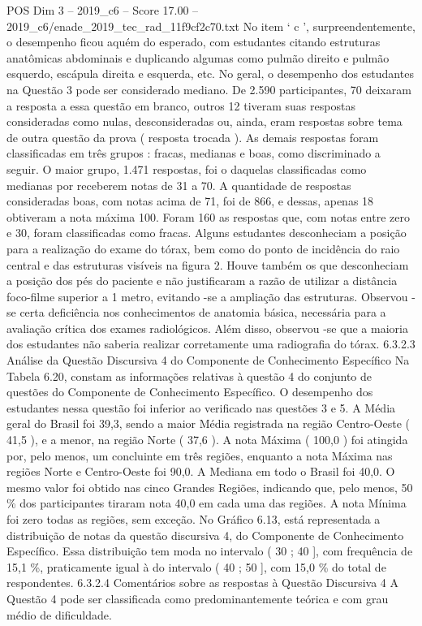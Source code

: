 \begin{textsample}{POS Dim 3 – 2019\_c6 – Score 17.00 – 2019\_c6/enade\_2019\_tec\_rad\_11f9cf2c70.txt}
No item ‘ c ’, surpreendentemente, o desempenho ficou aquém do esperado, com estudantes citando estruturas anatômicas abdominais e duplicando algumas como pulmão direito e pulmão esquerdo, escápula direita e esquerda, etc.
No geral, o desempenho dos estudantes na Questão 3 pode ser considerado mediano.
De 2.590 participantes, 70 deixaram a resposta a essa questão em branco, outros 12 tiveram suas respostas consideradas como nulas, desconsideradas ou, ainda, eram respostas sobre tema de outra questão da prova ( resposta trocada ).
As demais respostas foram classificadas em três grupos : fracas, medianas e boas, como discriminado a seguir.
O maior grupo, 1.471 respostas, foi o daquelas classificadas como medianas por receberem notas de 31 a 70.
A quantidade de respostas consideradas boas, com notas acima de 71, foi de 866, e dessas, apenas 18 obtiveram a nota máxima 100.
Foram 160 as respostas que, com notas entre zero e 30, foram classificadas como fracas.
Alguns estudantes desconheciam a posição para a realização do exame do tórax, bem como do ponto de incidência do raio central e das estruturas visíveis na figura 2.
Houve também os que desconheciam a posição dos pés do paciente e não justificaram a razão de utilizar a distância foco-filme superior a 1 metro, evitando -se a ampliação das estruturas.
Observou -se certa deficiência nos conhecimentos de anatomia básica, necessária para a avaliação crítica dos exames radiológicos.
Além disso, observou -se que a maioria dos estudantes não saberia realizar corretamente uma radiografia do tórax. 6.3.2.3 Análise da Questão Discursiva 4 do Componente de Conhecimento Específico Na Tabela 6.20, constam as informações relativas à questão 4 do conjunto de questões do Componente de Conhecimento Específico.
O desempenho dos estudantes nessa questão foi inferior ao verificado nas questões 3 e 5.
A Média geral do Brasil foi 39,3, sendo a maior Média registrada na região Centro-Oeste ( 41,5 ), e a menor, na região Norte ( 37,6 ).
A nota Máxima ( 100,0 ) foi atingida por, pelo menos, um concluinte em três regiões, enquanto a nota Máxima nas regiões Norte e Centro-Oeste foi 90,0.
A Mediana em todo o Brasil foi 40,0.
O mesmo valor foi obtido nas cinco Grandes Regiões, indicando que, pelo menos, 50 \% dos participantes tiraram nota 40,0 em cada uma das regiões.
A nota Mínima foi zero todas as regiões, sem exceção.
No Gráfico 6.13, está representada a distribuição de notas da questão discursiva 4, do Componente de Conhecimento Específico.
Essa distribuição tem moda no intervalo ( 30 ; 40 ], com frequência de 15,1 \%, praticamente igual à do intervalo ( 40 ; 50 ], com 15,0 \% do total de respondentes. 6.3.2.4 Comentários sobre as respostas à Questão Discursiva 4 A Questão 4 pode ser classificada como predominantemente teórica e com grau médio de dificuldade.

\end{textsample}
